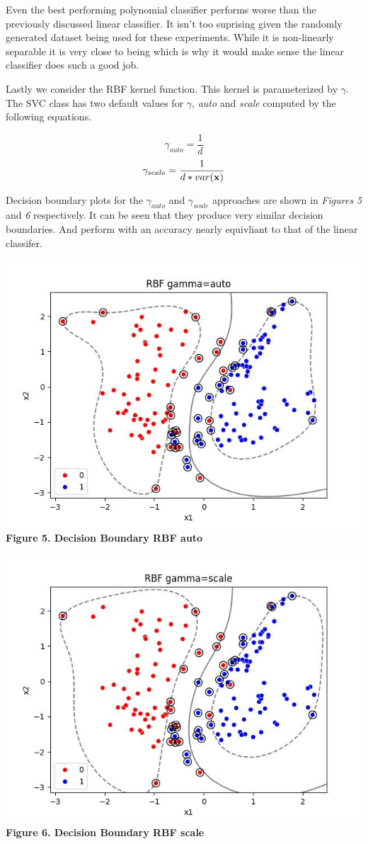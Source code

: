 \documentclass[11pt]{article}
\begin{document}
Even the best performing polynomial classifier performs worse than the
previously discussed linear classifier. It isn't too suprising given the
randomly generated dataset being used for these experiments. While it is
non-linearly separable it is very close to being which is why it would
make sense the linear classifier does such a good job.

Lastly we consider the RBF kernel function. This kernel is parameterized
by \(\gamma\). The SVC class has two default values for \(\gamma\),
\emph{auto} and \emph{scale} computed by the following equations.

\[
\gamma_{auto} = \frac{1}{d}
\] \[
\gamma_{scale} = \frac{1}{d*var(\bf{x})}
\]

Decision boundary plots for the \(\gamma_{auto}\) and \(\gamma_{scale}\)
approaches are shown in \emph{Figures 5} and \emph{6} respectively. It
can be seen that they produce very similar decision boundaries. And
perform with an accuracy nearly equivliant to that of the linear
classifer.

\includegraphics{figures/3_1_rbf_auto.jpg}\\
\textbf{Figure 5. Decision Boundary RBF auto}

\includegraphics{figures/3_1_rbf_scale.jpg}\\
\textbf{Figure 6. Decision Boundary RBF scale}
\end{document}

